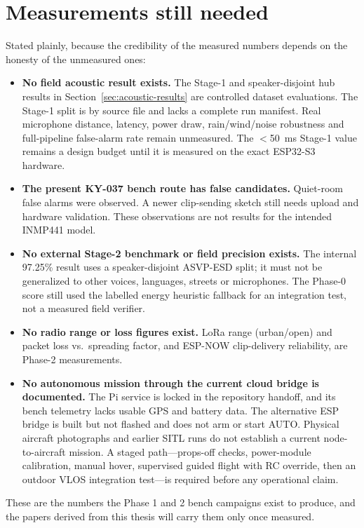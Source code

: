 \documentclass[12pt,a4paper]{report}
\begin{document}
\section{Measurements still needed}
\label{sec:notmeasured}

Stated plainly, because the credibility of the measured numbers
depends on the honesty of the unmeasured ones:
\begin{itemize}
\item \textbf{No field acoustic result exists.} The Stage-1 and
  speaker-disjoint hub results in Section~\ref{sec:acoustic-results} are
  controlled dataset evaluations. The Stage-1 split is by source file
  and lacks a complete run manifest. Real microphone distance, latency,
  power draw, rain/wind/noise robustness and full-pipeline false-alarm
  rate remain unmeasured. The $<$50~ms Stage-1 value remains a design
  budget until it is measured on the exact ESP32-S3 hardware.
\item \textbf{The present KY-037 bench route has false candidates.}
  Quiet-room false alarms were observed. A newer clip-sending sketch
  still needs upload and hardware validation. These observations are
  not results for the intended INMP441 model.
\item \textbf{No external Stage-2 benchmark or field precision exists.}
  The internal 97.25\% result uses a speaker-disjoint ASVP-ESD split;
  it must not be generalized to other voices, languages, streets or
  microphones. The Phase-0 score still used the labelled energy
  heuristic fallback for an integration test, not a measured field
  verifier.
\item \textbf{No radio range or loss figures exist.} LoRa range
  (urban/open) and packet loss vs.\ spreading factor, and ESP-NOW
  clip-delivery reliability, are Phase-2 measurements.
\item \textbf{No autonomous mission through the current cloud bridge
  is documented.} The Pi service is locked in the repository handoff,
  and its bench telemetry lacks usable GPS and battery data. The
  alternative ESP bridge is built but not flashed and does not arm
  or start AUTO. Physical aircraft photographs and earlier SITL runs
  do not establish a current node-to-aircraft mission. A staged path---props-off
  checks, power-module calibration, manual hover, supervised guided
  flight with RC override, then an outdoor VLOS integration test---is
  required before any operational claim.
\end{itemize}

These are the numbers the Phase 1 and 2 bench campaigns exist to produce,
and the papers derived from this thesis will carry them only once
measured.
\end{document}
